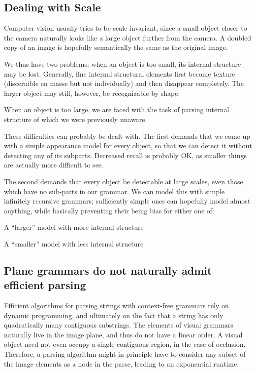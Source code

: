\subsection{Dealing with Scale}

Computer vision usually tries to be scale invariant, since a small
object closer to the camera naturally looks like a large object
further from the camera. A doubled copy of an image is hopefully
semantically the same as the original image.

We thus have two problems: when an object is too small, its internal
structure may be lost. Generally, fine internal structural elements
first become texture (discernible en masse but not individually) and
then disappear completely. The larger object may still, however, be
recognizable by shape.

When an object is too large, we are faced with the task of parsing
internal structure of which we were previously unaware.

These difficulties can probably be dealt with. The first demands that
we come up with a simple appearance model for every object, so that we
can detect it without detecting any of its subparts. Decreased recall
is probably OK, as smaller things are actually more difficult to see.

The second demands that every object be detectable at large scales,
even those which have no sub-parts in our grammar. We can model this
with simple infinitely recursive grammars; sufficiently simple ones
can hopefully model almost anything, while basically preventing their
being bias for either one of: 
\bitem
\item A ``larger'' model with more internal structure
\item A ``smaller'' model with less internal structure
\eitem

\subsection{Plane grammars do not naturally admit efficient parsing}

Efficient algorithms for parsing strings with context-free grammars
rely on dynamic programming, and ultimately on the fact that a string
has only quadratically many contiguous substrings. The elements of
visual grammars naturally live in the image plane, and thus do not
have a linear order. A visual object need not even occupy a single
contiguous region, in the case of occlusion. Therefore, a parsing
algorithm might in principle have to consider any subset of the image
elements as a node in the parse, leading to an exponential runtime.


